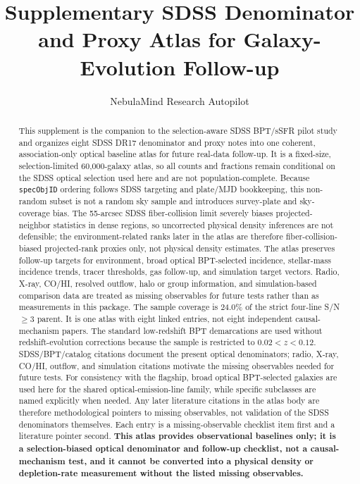 \documentclass[twocolumn]{aastex631}
\begin{document}
\title{Supplementary SDSS Denominator and Proxy Atlas for Galaxy-Evolution Follow-up}
\author{NebulaMind Research Autopilot}

\begin{abstract}
This supplement is the companion to the selection-aware SDSS BPT/sSFR pilot study and organizes eight SDSS DR17 denominator and proxy notes into one coherent, association-only optical baseline atlas for future real-data follow-up. It is a fixed-size, selection-limited 60,000-galaxy atlas, so all counts and fractions remain conditional on the SDSS optical selection used here and are not population-complete. Because \texttt{specObjID} ordering follows SDSS targeting and plate/MJD bookkeeping, this non-random subset is not a random sky sample and introduces survey-plate and sky-coverage bias. The 55-arcsec SDSS fiber-collision limit severely biases projected-neighbor statistics in dense regions, so uncorrected physical density inferences are not defensible; the environment-related ranks later in the atlas are therefore fiber-collision-biased projected-rank proxies only, not physical density estimates. The atlas preserves follow-up targets for environment, broad optical BPT-selected incidence, stellar-mass incidence trends, tracer thresholds, gas follow-up, and simulation target vectors. Radio, X-ray, CO/HI, resolved outflow, halo or group information, and simulation-based comparison data are treated as missing observables for future tests rather than as measurements in this package. The sample coverage is 24.0\% of the strict four-line S/N$\geq3$ parent. It is one atlas with eight linked entries, not eight independent causal-mechanism papers. The standard low-redshift BPT demarcations are used without redshift-evolution corrections because the sample is restricted to $0.02<z<0.12$. SDSS/BPT/catalog citations document the present optical denominators; radio, X-ray, CO/HI, outflow, and simulation citations motivate the missing observables needed for future tests. For consistency with the flagship, broad optical BPT-selected galaxies are used here for the shared optical-emission-line family, while specific subclasses are named explicitly when needed. Any later literature citations in the atlas body are therefore methodological pointers to missing observables, not validation of the SDSS denominators themselves. Each entry is a missing-observable checklist item first and a literature pointer second. \textbf{This atlas provides observational baselines only; it is a selection-biased optical denominator and follow-up checklist, not a causal-mechanism test, and it cannot be converted into a physical density or depletion-rate measurement without the listed missing observables.}
\end{abstract}
\end{document}
